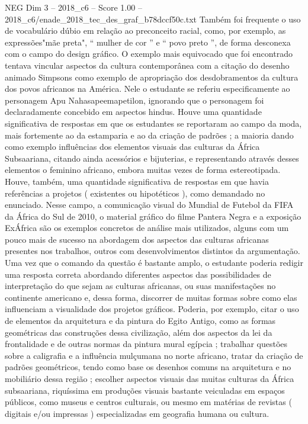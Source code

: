 \begin{textsample}{NEG Dim 3 – 2018\_c6 – Score 1.00 – 2018\_c6/enade\_2018\_tec\_des\_graf\_b78dccf50c.txt}
Também foi frequente o uso de vocabulário dúbio em relação ao preconceito racial, como, por exemplo, as expressões"mãe preta", “ mulher de cor ” e “ povo preto ”, de forma desconexa com o campo do design gráfico.
O exemplo mais equivocado que foi encontrado tentava vincular aspectos da cultura contemporânea com a citação do desenho animado Simpsons como exemplo de apropriação dos desdobramentos da cultura dos povos africanos na América.
Nele o estudante se referiu especificamente ao personagem Apu Nahasapeemapetilon, ignorando que o personagem foi declaradamente concebido em aspectos hindus.
Houve uma quantidade significativa de respostas em que os estudantes se reportaram ao campo da moda, mais fortemente ao da estamparia e ao da criação de padrões ; a maioria dando como exemplo influências dos elementos visuais das culturas da África Subsaariana, citando ainda acessórios e bijuterias, e representando através desses elementos o feminino africano, embora muitas vezes de forma estereotipada.
Houve, também, uma quantidade significativa de respostas em que havia referências a projetos ( existentes ou hipotéticos ), como demandado no enunciado.
Nesse campo, a comunicação visual do Mundial de Futebol da FIFA da África do Sul de 2010, o material gráfico do filme Pantera Negra e a exposição ExÁfrica são os exemplos concretos de análise mais utilizados, alguns com um pouco mais de sucesso na abordagem dos aspectos das culturas africanas presentes nos trabalhos, outros com desenvolvimentos distintos da argumentação.
Uma vez que o comando da questão é bastante amplo, o estudante poderia redigir uma resposta correta abordando diferentes aspectos das possibilidades de interpretação do que sejam as culturas africanas, ou suas manifestações no continente americano e, dessa forma, discorrer de muitas formas sobre como elas influenciam a visualidade dos projetos gráficos.
Poderia, por exemplo, citar o uso de elementos da arquitetura e da pintura do Egito Antigo, como as formas geométricas das construções dessa civilização, além dos aspectos da lei da frontalidade e de outras normas da pintura mural egípcia ; trabalhar questões sobre a caligrafia e a influência mulçumana no norte africano, tratar da criação de padrões geométricos, tendo como base os desenhos comuns na arquitetura e no mobiliário dessa região ; escolher aspectos visuais das muitas culturas da África subsaariana, riquíssima em produções visuais bastante veiculadas em espaços públicos, como museus e centros culturais, ou mesmo em matérias de revistas ( digitais e/ou impressas ) especializadas em geografia humana ou cultura.

\end{textsample}
